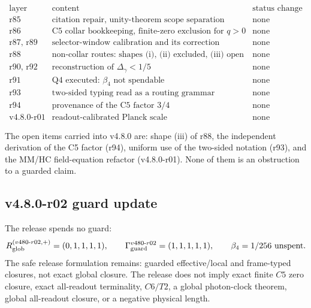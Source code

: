 \[
\begin{array}{l|l|l}
\text{layer} & \text{content} & \text{status change}\\
\hline
\text{r85} & \text{citation repair, unity-theorem scope separation} & \text{none}\\
\text{r86} & \text{C5 collar bookkeeping, finite-zero exclusion for } q>0 & \text{none}\\
\text{r87, r89} & \text{selector-window calibration and its correction} & \text{none}\\
\text{r88} & \text{non-collar routes: shapes (i), (ii) excluded, (iii) open} & \text{none}\\
\text{r90, r92} & \text{reconstruction of } \Delta_\gamma<1/5 & \text{none}\\
\text{r91} & \text{Q4 executed: } \beta_4 \text{ not spendable} & \text{none}\\
\text{r93} & \text{two-sided typing read as a routing grammar} & \text{none}\\
\text{r94} & \text{provenance of the C5 factor } 3/4 & \text{none}\\
\text{v4.8.0-r01} & \text{readout-calibrated Planck scale} & \text{none}
\end{array}
\]

The open items carried into v4.8.0 are: shape (iii) of r88, the independent derivation of
the C5 factor (r94), uniform use of the two-sided notation (r93), and the MM/HC field-equation
refactor (v4.8.0-r01).  None of them is an obstruction to a guarded claim.

\subsection*{v4.8.0-r02 guard update}
\label{subsec:v480-r02-guard-update}

The release spends no guard:
\[
R_{\rm glob}^{(v480\text{-}r02,+)}=(0,1,1,1,1),
\qquad
\Gamma_{\rm guard}^{v480\text{-}r02}=(1,1,1,1,1),
\qquad
\beta_4=1/256\ \text{unspent}.
\]
The safe release formulation remains: guarded effective/local and frame-typed closures, not
exact global closure.  The release does not imply exact finite \(C5\) zero closure, exact
all-readout terminality, \(C6/T2\), a global photon-clock theorem, global all-readout
closure, or a negative physical length.
